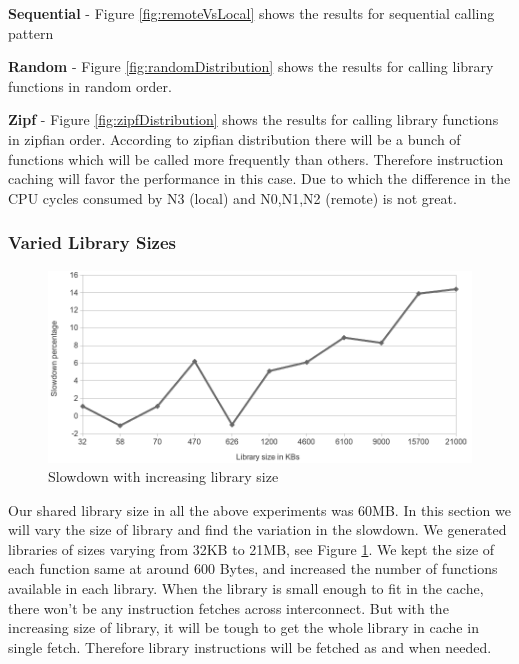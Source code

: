 \textbf{Sequential} - Figure \ref{fig:remoteVsLocal} shows the results for sequential calling pattern

\textbf{Random} - Figure \ref{fig:randomDistribution} shows the results for calling library functions in random order.

\textbf{Zipf} - Figure \ref{fig:zipfDistribution} shows the results for calling library functions in zipfian order.
According to zipfian distribution there will be a bunch of functions which will be called more frequently than others.
Therefore instruction caching will favor the performance in this case.
Due to which the difference in the CPU cycles consumed by N3 (local) and N0,N1,N2 (remote) is not great.


\subsubsection{Varied Library Sizes}

\begin{figure}
    \centering
    \includegraphics[scale=0.39]{slowdownWithSize.png}
    \caption{Slowdown with increasing library size }
    \label{fig:slowdownWithSize.png}
\end{figure}

Our shared library size in all the above experiments was 60MB.
In this section we will vary the size of library and find the variation in the slowdown.
We generated libraries of sizes varying from 32KB to 21MB, see Figure \ref{fig:slowdownWithSize.png}.
We kept the size of each function same at around 600 Bytes, and increased the number of functions available in each library.
When the library is small enough to fit in the cache, there won't be any instruction fetches across interconnect.
But with the increasing size of library, it will be tough to get the whole library in cache in single fetch.
Therefore library instructions will be fetched as and when needed.

